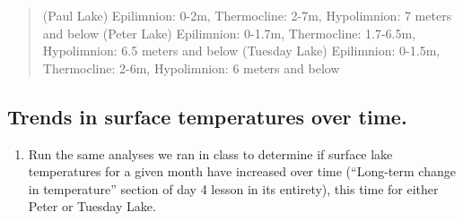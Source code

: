 \documentclass[]{article}
\newenvironment{Shaded}{\begin{snugshade}}{\end{snugshade}}
\newcommand{\DataTypeTok}[1]{\textcolor[rgb]{0.13,0.29,0.53}{#1}}
\newcommand{\DecValTok}[1]{\textcolor[rgb]{0.00,0.00,0.81}{#1}}
\newcommand{\KeywordTok}[1]{\textcolor[rgb]{0.13,0.29,0.53}{\textbf{#1}}}
\newcommand{\NormalTok}[1]{#1}
\newcommand{\OperatorTok}[1]{\textcolor[rgb]{0.81,0.36,0.00}{\textbf{#1}}}
\newcommand{\StringTok}[1]{\textcolor[rgb]{0.31,0.60,0.02}{#1}}
\providecommand{\tightlist}{%
  \setlength{\itemsep}{0pt}\setlength{\parskip}{0pt}}
\begin{document}
\begin{quote}
(Paul Lake) Epilimnion: 0-2m, Thermocline: 2-7m, Hypolimnion: 7 meters
and below (Peter Lake) Epilimnion: 0-1.7m, Thermocline: 1.7-6.5m,
Hypolimnion: 6.5 meters and below (Tuesday Lake) Epilimnion: 0-1.5m,
Thermocline: 2-6m, Hypolimnion: 6 meters and below
\end{quote}

\hypertarget{trends-in-surface-temperatures-over-time.}{%
\subsection{Trends in surface temperatures over
time.}\label{trends-in-surface-temperatures-over-time.}}

\begin{enumerate}
\def\labelenumi{\arabic{enumi}.}
\setcounter{enumi}{10}
\tightlist
\item
  Run the same analyses we ran in class to determine if surface lake
  temperatures for a given month have increased over time (``Long-term
  change in temperature'' section of day 4 lesson in its entirety), this
  time for either Peter or Tuesday Lake.
\end{enumerate}

\begin{Shaded}
\end{Shaded}
\end{document}
